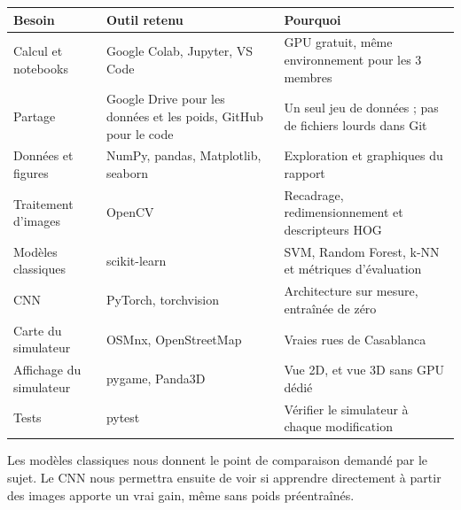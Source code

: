 \begin{center}
\small
\begin{tabularx}{\textwidth}{>{\raggedright\arraybackslash}p{3.4cm}>{\raggedright\arraybackslash}p{4.6cm}Y}
  \toprule
  \textbf{Besoin} & \textbf{Outil retenu} & \textbf{Pourquoi} \\
  \midrule
  Calcul et notebooks & Google Colab, Jupyter, VS Code & GPU gratuit, même environnement pour les 3 membres \\
  Partage & Google Drive pour les données et les poids, GitHub pour le code & Un seul jeu de données ; pas de fichiers lourds dans Git \\
  Données et figures & NumPy, pandas, Matplotlib, seaborn & Exploration et graphiques du rapport \\
  Traitement d'images & OpenCV & Recadrage, redimensionnement et descripteurs HOG \\
  Modèles classiques & scikit-learn & SVM, Random Forest, k-NN et métriques d'évaluation \\
  CNN & PyTorch, torchvision & Architecture sur mesure, entraînée de zéro \\
  Carte du simulateur & OSMnx, OpenStreetMap & Vraies rues de Casablanca \\
  Affichage du simulateur & pygame, Panda3D & Vue 2D, et vue 3D sans GPU dédié \\
  Tests & pytest & Vérifier le simulateur à chaque modification \\
  \bottomrule
\end{tabularx}
\end{center}

Les modèles classiques nous donnent le point de comparaison demandé par le sujet. Le CNN nous permettra ensuite de voir si apprendre directement à partir des images apporte un vrai gain, même sans poids préentraînés.
